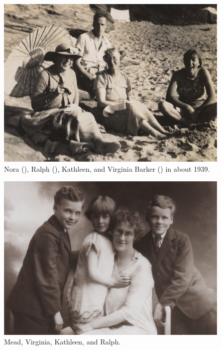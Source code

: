 \begin{figure}
\centering
\includegraphics{photos/Barker_family_c1939}
\caption{Nora (), Ralph (), Kathleen, and Virginia Barker () in about 1939.}
\end{figure}

\begin{figure}
\centering
\includegraphics{photos/Mead_Virginia_Kathleen_and_Ralph.png}
\caption{Mead, Virginia, Kathleen, and Ralph.}
\end{figure}
